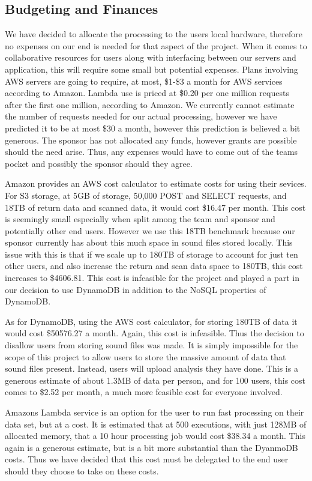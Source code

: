 \subsection{Budgeting and Finances}
We have decided to allocate the processing to the user\textquotesingle s local hardware, therefore no expenses on our end is needed for that aspect of the project. When it comes to collaborative resources for users along with interfacing between our servers and application, this will require some small but potential expenses. Plans involving AWS servers are going to require, at most, \$1-\$3 a month for AWS services according to Amazon. Lambda use is priced at \$0.20 per one million requests after the first one million, according to Amazon. We currently cannot estimate the number of requests needed for our actual processing, however we have predicted it to be at most \$30 a month, however this prediction is believed a bit generous. The sponsor has not allocated any funds, however grants are possible should the need arise. Thus, any expenses would have to come out of the team\textquotesingle s pocket and possibly the sponsor should they agree.\par
Amazon provides an AWS cost calculator to estimate costs for using their sevices. For S3 storage, at 5GB of storage, 50,000 POST and SELECT requests, and 18TB of return data and scanned data, it would cost \$16.47 per month. This cost is seemingly small especially when split among the team and sponsor and potentially other end users. However we use this 18TB benchmark because our sponsor currently has about this much space in sound files stored locally. This issue with this is that if we scale up to 180TB of storage to account for just ten other users, and also increase the return and scan data space to 180TB, this cost increases to \$4606.81. This cost is infeasible for the project and played a part in our decision to use DynamoDB in addition to the NoSQL properties of DynamoDB.\par
As for DynamoDB, using the AWS cost calculator, for storing 180TB of data it would cost \$50576.27 a month. Again, this cost is infeasible. Thus the decision to disallow users from storing sound files was made. It is simply impossible for the scope of this project to allow users to store the massive amount of data that sound files present. Instead, users will upload analysis they have done. This is a generous estimate of about 1.3MB of data per person, and for 100 users, this cost comes to \$2.52 per month, a much more feasible cost for everyone involved.\par
Amazon\textquotesingle s Lambda service is an option for the user to run fast processing on their data set, but at a cost. It is estimated that at 500 executions, with just 128MB of allocated memory, that a 10 hour processing job would cost \$38.34 a month. This again is a generous estimate, but is a bit more substantial than the DyanmoDB costs. Thus we have decided that this cost must be delegated to the end user should they choose to take on these costs.

